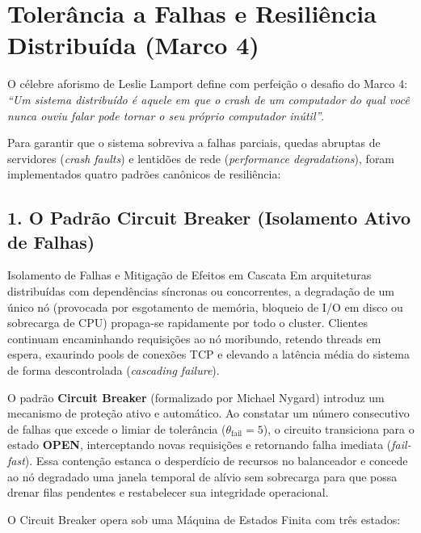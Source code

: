 \documentclass[11pt,a4paper]{article}
\begin{document}
\section{Tolerância a Falhas e Resiliência Distribuída (Marco 4)}

O célebre aforismo de Leslie Lamport define com perfeição o desafio do Marco 4: \textit{``Um sistema distribuído é aquele em que o crash de um computador do qual você nunca ouviu falar pode tornar o seu próprio computador inútil''}.

Para garantir que o sistema sobreviva a falhas parciais, quedas abruptas de servidores (\textit{crash faults}) e lentidões de rede (\textit{performance degradations}), foram implementados quatro padrões canônicos de resiliência:

\subsection{1. O Padrão Circuit Breaker (Isolamento Ativo de Falhas)}

\begin{fundamento}{Isolamento de Falhas e Mitigação de Efeitos em Cascata}
Em arquiteturas distribuídas com dependências síncronas ou concorrentes, a degradação de um único nó (provocada por esgotamento de memória, bloqueio de I/O em disco ou sobrecarga de CPU) propaga-se rapidamente por todo o cluster. Clientes continuam encaminhando requisições ao nó moribundo, retendo threads em espera, exaurindo pools de conexões TCP e elevando a latência média do sistema de forma descontrolada (\textit{cascading failure}).

O padrão \textbf{Circuit Breaker} (formalizado por Michael Nygard) introduz um mecanismo de proteção ativo e automático. Ao constatar um número consecutivo de falhas que excede o limiar de tolerância ($\theta_{\text{fail}} = 5$), o circuito transiciona para o estado \textbf{OPEN}, interceptando novas requisições e retornando falha imediata (\textit{fail-fast}). Essa contenção estanca o desperdício de recursos no balanceador e concede ao nó degradado uma janela temporal de alívio sem sobrecarga para que possa drenar filas pendentes e restabelecer sua integridade operacional.
\end{fundamento}

O Circuit Breaker opera sob uma Máquina de Estados Finita com três estados:
\end{document}
